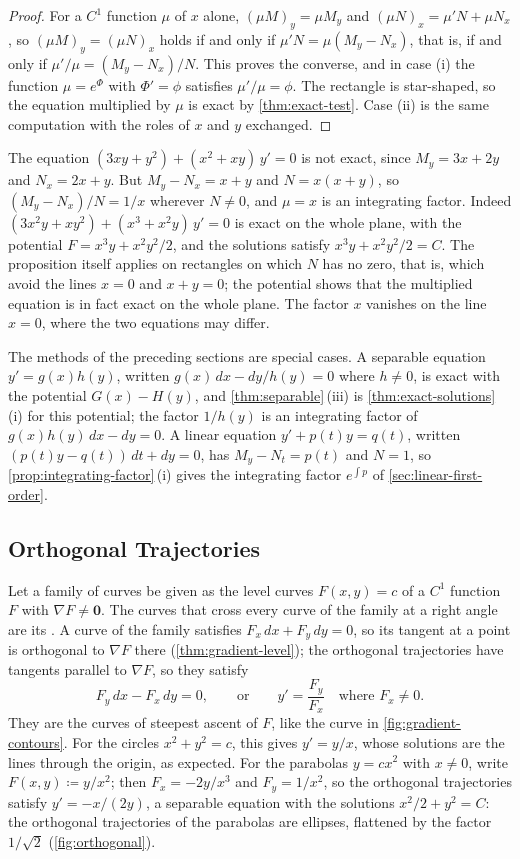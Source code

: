 \begin{proof}
For a $C^1$ function $\mu$ of $x$ alone, $(\mu M)_y=\mu M_y$ and $(\mu N)_x=\mu'N+\mu N_x$, so $(\mu M)_y=(\mu N)_x$ holds if and only if $\mu'N=\mu(M_y-N_x)$, that is, if and only if $\mu'/\mu=(M_y-N_x)/N$. This proves the converse, and in case (i) the function $\mu=e^\Phi$ with $\Phi'=\phi$ satisfies $\mu'/\mu=\phi$. The rectangle is star-shaped, so the equation multiplied by $\mu$ is exact by \cref{thm:exact-test}. Case (ii) is the same computation with the roles of $x$ and $y$ exchanged.
\end{proof}

The equation $(3xy+y^2)+(x^2+xy)\,y'=0$ is not exact, since $M_y=3x+2y$ and $N_x=2x+y$. But $M_y-N_x=x+y$ and $N=x(x+y)$, so $(M_y-N_x)/N=1/x$ wherever $N\ne0$, and $\mu=x$ is an integrating factor. Indeed $(3x^2y+xy^2)+(x^3+x^2y)\,y'=0$ is exact on the whole plane, with the potential $F=x^3y+x^2y^2/2$, and the solutions satisfy $x^3y+x^2y^2/2=C$. The proposition itself applies on rectangles on which $N$ has no zero, that is, which avoid the lines $x=0$ and $x+y=0$; the potential shows that the multiplied equation is in fact exact on the whole plane. The factor $x$ vanishes on the line $x=0$, where the two equations may differ.

The methods of the preceding sections are special cases. A separable equation $y'=g(x)h(y)$, written $g(x)\,dx-dy/h(y)=0$ where $h\ne0$, is exact with the potential $G(x)-H(y)$, and \cref{thm:separable}\,(iii) is \cref{thm:exact-solutions}\,(i) for this potential; the factor $1/h(y)$ is an integrating factor of $g(x)h(y)\,dx-dy=0$. A linear equation $y'+p(t)y=q(t)$, written $(p(t)y-q(t))\,dt+dy=0$, has $M_y-N_t=p(t)$ and $N=1$, so \cref{prop:integrating-factor}\,(i) gives the integrating factor $e^{\int p}$ of \cref{sec:linear-first-order}.

\subsection{Orthogonal Trajectories}

Let a family of curves be given as the level curves $F(x,y)=c$ of a $C^1$ function $F$ with $\nabla F\ne\mathbf 0$. The curves that cross every curve of the family at a right angle are its . A curve of the family satisfies $F_x\,dx+F_y\,dy=0$, so its tangent at a point is orthogonal to $\nabla F$ there (\cref{thm:gradient-level}); the orthogonal trajectories have tangents parallel to $\nabla F$, so they satisfy
\[
F_y\,dx-F_x\,dy=0,\qquad\text{or}\qquad y'=\frac{F_y}{F_x}\quad\text{where }F_x\ne0 .
\]
They are the curves of steepest ascent of $F$, like the curve in \cref{fig:gradient-contours}. For the circles $x^2+y^2=c$, this gives $y'=y/x$, whose solutions are the lines through the origin, as expected. For the parabolas $y=cx^2$ with $x\ne0$, write $F(x,y)\coloneqq y/x^2$; then $F_x=-2y/x^3$ and $F_y=1/x^2$, so the orthogonal trajectories satisfy $y'=-x/(2y)$, a separable equation with the solutions $x^2/2+y^2=C$: the orthogonal trajectories of the parabolas are ellipses, flattened by the factor $1/\sqrt2$ (\cref{fig:orthogonal}).

